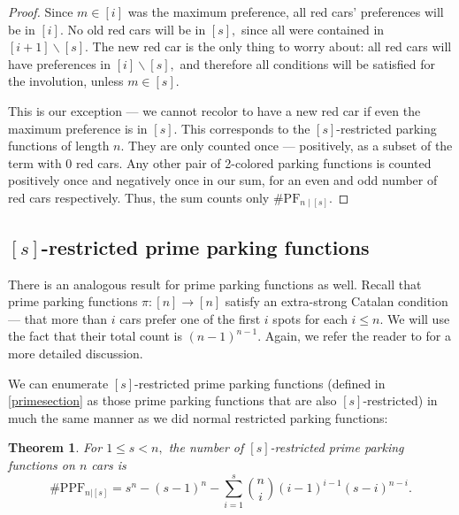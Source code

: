 \documentclass[12 pt]{amsart}
\newtheorem{theorem}{Theorem}
\theoremstyle{definition} %
\theoremstyle{remark} %
\begin{document}
\begin{proof}
    Since $m \in [i]$ was the maximum preference, all red cars' preferences will be in $[i].$ No old red cars will be in $[s],$ since all were contained in $[i+1]\backslash [s].$ The new red car is the only thing to worry about: all red cars will have preferences in $[i]\backslash [s],$ and therefore all conditions will be satisfied for the involution, unless $m\in [s].$

	This is our exception --- we cannot recolor to have a new red car if even the maximum preference is in $[s]$. This corresponds to the $[s]$-restricted parking functions of length $n$. They are only counted once --- positively, as a subset of the term with 0 red cars. Any other pair of 2-colored parking functions is counted positively once and negatively once in our sum, for an even and odd number of red cars respectively. Thus, the sum counts only $\#\mathrm{PF}_{n \mid [s]}$.
\end{proof}

\subsection{\texorpdfstring{$[s]$-r}{R}estricted prime parking functions}

There is an analogous result for prime parking functions as well. Recall that prime parking functions $\pi:[n]\to[n]$ satisfy an extra-strong Catalan condition --- that more than $i$ cars prefer one of the first $i$ spots for each $i \le n$. We will use the fact that their total count is $(n-1)^{n-1}$. Again, we refer the reader to \cite{armon-2024} for a more detailed discussion.

We can enumerate $[s]$-restricted prime parking functions (defined in \cref{primesection} as those prime parking functions that are also $[s]$-restricted) in much the same manner as we did normal restricted parking functions:

\begin{theorem}
    \label{thm:resPPFcount1}
    For $1 \le s < n,$ the number of $[s]$-restricted prime parking functions on $n$ cars is 
    \[\#\mathrm{PPF}_{n|[s]}=s^{n} - (s - 1)^{n} - \sum_{i = 1}^{s} \binom{n}{i} (i - 1)^{i - 1} (s - i)^{n - i}.\]
\end{theorem}
\end{document}
